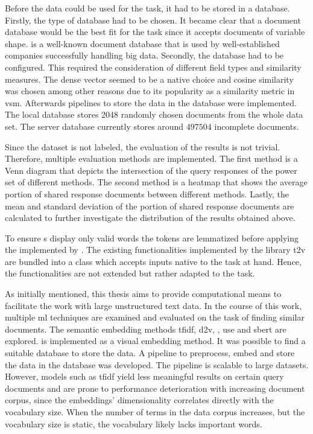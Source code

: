 Before the data could be used for the task, it had to be stored in a database.
Firstly, the type of database had to be chosen.
It became clear that a document database would be the best fit for the task 
since it accepts documents of variable shape.
\databaseName{} is a well-known document database that is used by 
well-established companies successfully handling big data.
Secondly, the database had to be configured.
This required the consideration of different field types and similarity measures.
The dense vector seemed to be a native choice and cosine similarity was chosen 
among other reasons due to its popularity as a similarity metric in \ac{vsm}.
Afterwards pipelines to store the data in the database were implemented.
The local database stores 2048 randomly chosen documents from the whole data set.
The server database currently stores around $497504$ incomplete documents.

Since the dataset is not labeled, the evaluation of the results is not trivial.
Therefore, multiple evaluation methods are implemented.
The first method is a Venn diagram that depicts the intersection of the query responses of the power set of different methods.
The second method is a heatmap that shows the average portion of shared response documents between different methods.
Lastly, the mean and standard deviation of the portion of shared response documents are calculated 
to further investigate the distribution of the results obtained above.

To ensure \wordcloud{}s display only valid words the tokens are lemmatized before applying the \wordcloud{} implemented by \citeauthor{wordcloud-dev}. 
The existing functionalities implemented by the library \ac{t2v} are bundled into a class 
which accepts inputs native to the task at hand.
Hence, the functionalities are not extended but rather adapted to the task.  


As initially mentioned, this thesis aims to provide computational means to facilitate the work with large unstructured text data.
In the course of this work, multiple \ac{ml} techniques are examined and evaluated on the task of finding similar documents.
The semantic embedding methods \ac{tfidf}, \ac{d2v}, \infersent{}, \ac{use} and \ac{sbert} are explored.
\eigendocs{} is implemented as a visual embedding method.
It was possible to find a suitable database to store the data.
A pipeline to preprocess, embed and store the data in the database was developed.
The pipeline is scalable to large datasets.
However, models such as \ac{tfidf} yield less meaningful results on certain query documents and 
are prone to performance deterioration with increasing document corpus, since the embeddings' 
dimensionality correlates directly with the vocabulary size.
When the number of terms in the data corpus increases, but the vocabulary size is static, 
the vocabulary likely lacks important words. 

